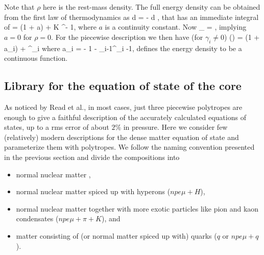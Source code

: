 Note that $\rho$ here is the rest-mass density.
The full energy density can be obtained from the first law of thermodynamics as
\be
d \frac{\epsilon}{\rho} = - d ,
\ee
that has an immediate integral of 
\be
\frac{\epsilon}{\rho} = (1 + a) +   K \rho^{\gamma - 1},
\ee
where $a$ is a continuity constant. 
Now
\be
\lim_{\rho {}} \frac{\epsilon}{\rho} = ,
\ee
implying $a=0$ for $\rho = 0$.
For the piecewise description we then have (for $\gamma_i \ne 0$)
\be
\epsilon(\rho) = (1 + a_i) \rho +   \rho^\gamma_i
\ee
where
\be
a_i =  - 1 -   \rho_{i-1}^{\gamma_i -1},
\ee
defines the energy density to be a continuous function.

\subsection{Library for the equation of state of the core}

As noticed by Read et al.\cite{Read09}, in most cases, just three piecewise polytropes are enough to give a faithful description of the accurately calculated equations of states, up to a rms error of about $2\%$ in pressure.
Here we consider few (relatively) modern descriptions for the dense matter equation of state and parameterize them with polytropes.
We follow the naming convention presented in the previous section and divide the compositions into
\begin{itemize}
    \item normal nuclear matter \npem,
    \item normal nuclear matter spiced up with hyperons ($npe\mu + H$),
    \item normal nuclear matter together with more exotic particles like pion and kaon condensates ($npe\mu + \pi + K$), and
    \item matter consisting of (or normal matter spiced up with) quarks ($q$ or $npe\mu + q$).
\end{itemize}

